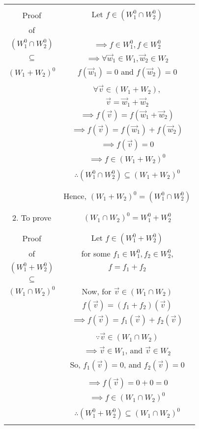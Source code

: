 \documentclass[journal,12pt,twocolumn]{IEEEtran}
\begin{document}
\begin{table}[h!]
\begin{center}
\begin{tabular}{|c|c|}
\hline
& \\
Proof & Let $f \in (W_1^0 \cap W_2^0)$\\
of & \\
$(W_1^0 \cap W_2^0)$ & $\implies f \in W_1^0, f \in W_2^0$\\
$\subseteq$ & $\implies \forall \vec{w}_1 \in W_1, \vec{w}_2 \in W_2$\\
$(W_1 + W_2)^0$ & $f(\vec{w}_1) = 0$ and $f(\vec{w}_2) = 0$\\
& \\
& $\forall \vec{v} \in (W_1+W_2),$\\
& $\vec{v} = \vec{w}_1 + \vec{w}_2$\\
& $\implies f(\vec{v}) = f(\vec{w}_1 + \vec{w}_2)$\\
& $\implies f(\vec{v}) = f(\vec{w}_1) + f(\vec{w}_2)$\\
& $\implies f(\vec{v}) = 0$\\
& $\implies f \in (W_1 + W_2)^0$\\
& \\
& $\therefore (W_1^0 \cap W_2^0) \subseteq (W_1 + W_2)^0$\\
& \\
\hline
& \\
& Hence, $(W_1 + W_2)^0 = (W_1^0 \cap W_2^0)$\\
& \\
\hline
& \\
2. To prove & $(W_1 \cap W_2)^0 = W_1^0 + W_2^0$\\
& \\
\hline
& \\
Proof & Let $f \in (W_1^0 + W_2^0)$\\
of & for some $f_1 \in W_1^0, f_2 \in W_2^0$,\\
$(W_1^0 + W_2^0)$ & $f = f_1 + f_2$\\
$\subseteq$ & \\
$(W_1 \cap W_2)^0$ & Now, for $\vec{v} \in (W_1 \cap W_2)$\\
& $f(\vec{v}) = (f_1 + f_2)(\vec{v})$\\
& $\implies f(\vec{v}) = f_1(\vec{v}) + f_2(\vec{v})$\\
& \\
& $\because \vec{v} \in (W_1 \cap W_2)$\\
& $\implies \vec{v} \in W_1$, and $\vec{v} \in W_2$\\
& So, $f_1(\vec{v}) = 0$, and $f_2(\vec{v}) = 0$\\
& \\
& $\implies f(\vec{v}) = 0 + 0 = 0$\\
& $\implies f \in (W_1 \cap W_2)^0$\\
& \\
& $\therefore (W_1^0 + W_2^0) \subseteq (W_1 \cap W_2)^0$\\
& \\
\hline
\end{tabular}
\end{center}
\end{table}
\end{document}
